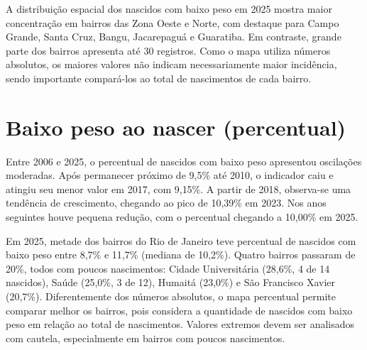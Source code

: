
A distribuição espacial dos nascidos com baixo peso em 2025 mostra maior concentração em bairros das Zona Oeste e Norte, com destaque para Campo Grande, Santa Cruz, Bangu, Jacarepaguá e Guaratiba. Em contraste, grande parte dos bairros apresenta até 30 registros. Como o mapa utiliza números absolutos, os maiores valores não indicam necessariamente maior incidência, sendo importante compará-los ao total de nascimentos de cada bairro.


\section{Baixo peso ao nascer (percentual)}


Entre 2006 e 2025, o percentual de nascidos com baixo peso apresentou oscilações moderadas. Após permanecer próximo de 9,5\% até 2010, o indicador caiu e atingiu seu menor valor em 2017, com 9,15\%. A partir de 2018, observa-se uma tendência de crescimento, chegando ao pico de 10,39\% em 2023. Nos anos seguintes houve pequena redução, com o percentual chegando a 10,00\% em 2025.


Em 2025, metade dos bairros do Rio de Janeiro teve percentual de nascidos com baixo peso entre 8,7\% e 11,7\% (mediana de 10,2\%). Quatro bairros passaram de 20\%, todos com poucos nascimentos: Cidade Universitária (28,6\%, 4 de 14 nascidos), Saúde (25,0\%, 3 de 12), Humaitá (23,0\%) e São Francisco Xavier (20,7\%). Diferentemente dos números absolutos, o mapa percentual permite comparar melhor os bairros, pois considera a quantidade de nascidos com baixo peso em relação ao total de nascimentos. Valores extremos devem ser analisados com cautela, especialmente em bairros com poucos nascimentos.

